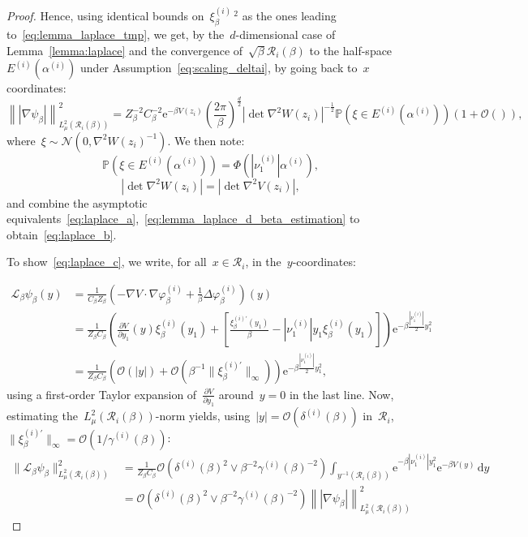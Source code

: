\documentclass[10pt]{article}
\newcommand{\cL}{\mathcal{L}}
\renewcommand{\d}{\mathrm{d}}
\newcommand{\e}{\mathrm{e}}
\renewcommand{\P}{\mathbb{P}}
\newcommand{\1}{\mathbbm 1}
\newcommand{\deltaRadius}[1]{\delta^{(#1)}} %
\newcommand{\epsLimit}[1]{\alpha^{(#1)}} %
\newcommand{\gammaPerturbation}[1]{\gamma^{(#1)}}
\newcommand{\localCuboid}[1]{\mathcal R_{#1}}
\newcommand{\hessEigval}[2]{\nu^{(#1)}_{#2}} %
\newcommand{\halfSpace}[1]{E^{(#1)}}
\newcommand{\fineCutoff}[1]{\xi_\beta^{(#1)}}
\renewcommand{\O}{\mathcal{O}}
\begin{document}
\begin{proof}
            Hence, using identical bounds on~$\fineCutoff{i}\,^2$ as the ones leading to~\eqref{eq:lemma_laplace_tmp}, we get, by the~$d$-dimensional case of Lemma~\ref{lemma:laplace} and the convergence of~$\sqrt\beta\localCuboid{i}(\beta)$ to the half-space~$\halfSpace{i}(\epsLimit{i})$ under Assumption~\eqref{eq:scaling_deltai}, by going back to~$x$ coordinates:
            \[\left\||\nabla \psi_\beta|\right\|^2_{L_\mu^2(\localCuboid{i}(\beta))} = Z_\beta^{-2}C_\beta^{-2}\e^{-\beta V(z_i)}\left(\frac{2\pi}{\beta}\right)^{\frac d2}|\det \nabla^2 W(z_i)|^{-\frac12}\P(\xi\in \halfSpace{i}(\epsLimit{i}))(1+\O()),\]
            where~$\xi\sim\mathcal N(0,\nabla^2 W(z_i)^{-1})$. We then note:
            \[\P(\xi\in \halfSpace{i}(\epsLimit{i})) = \Phi(|\hessEigval{i}{1}|\epsLimit{i}),\]
            \[|\det \nabla^2 W(z_i)|=|\det\nabla^2 V(z_i)|,\]
            and combine the asymptotic equivalents~\eqref{eq:laplace_a},~\eqref{eq:lemma_laplace_d_beta_estimation} to obtain~\eqref{eq:laplace_b}.

            To show~\eqref{eq:laplace_c}, we write, for all~$x \in \mathcal R_i$, in the~$y$-coordinates:

            \begin{align*}
                \cL_\beta\psi_\beta(y) &= \frac1{C_\beta Z_\beta}\left(-\nabla V \cdot \nabla \varphi_\beta^{(i)} + \frac1\beta\Delta\varphi_\beta^{(i)}\right)(y)\\
                &= \frac1{Z_\beta C_\beta}\left(\frac{\partial V}{\partial y_1}(y)\fineCutoff{i}(y_1) + \left[\frac{\xi_\beta^{(i)\prime}(y_1)}{\beta}- |\hessEigval{i}{1}|y_1\fineCutoff{i}(y_1)\right]\right)\e^{-\beta\frac{|\hessEigval{i}{1}|}{2}y_1^2}\\
                &= \frac1{Z_\beta C_\beta}\left(\O(|y|) + \O\left(\beta^{-1}\|\xi_\beta^{(i)\prime}\|_\infty\right)\right)\e^{-\beta\frac{|\hessEigval{i}{1}|}{2}y_1^2},
            \end{align*}
            using a first-order Taylor expansion of~$\frac{\partial V}{\partial y_1}$ around~$y=0$ in the last line. Now, estimating the~$L^2_\mu(\localCuboid{i}(\beta))$-norm yields, using~$|y| = \O\left(\deltaRadius{i}(\beta)\right)$ in~$\localCuboid{i}$,~$\|\xi_\beta^{(i)\prime}\|_\infty = \O(1/\gammaPerturbation{i}(\beta))$:
            \begin{align*}
                \|\cL_\beta \psi_\beta\|^2_{L^2_\mu(\localCuboid{i}(\beta))} &= \frac1{Z_\beta C_\beta}\O\left(\deltaRadius{i}(\beta)^2 \lor \beta^{-2}\gammaPerturbation{i}(\beta)^{-2}\right) \int_{y^{-1}(\localCuboid{i}(\beta))}\e^{-\beta|\hessEigval{i}{1}|y_1^2}\e^{-\beta V(y)}\,\d y\\
                &= \O\left(\deltaRadius{i}(\beta)^2 \lor \beta^{-2}\gammaPerturbation{i}(\beta)^{-2}\right) \left\||\nabla \psi_\beta|\right\|^2_{L_\mu^2(\localCuboid{i}(\beta))}
            \end{align*} 
        \end{proof}
\end{document}
